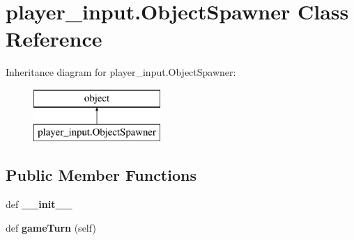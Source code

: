 \hypertarget{classplayer__input_1_1_object_spawner}{}\section{player\+\_\+input.\+Object\+Spawner Class Reference}
\label{classplayer__input_1_1_object_spawner}
Inheritance diagram for player\+\_\+input.\+Object\+Spawner\+:\begin{figure}[H]
\begin{center}
\leavevmode
\includegraphics[height=2.000000cm]{classplayer__input_1_1_object_spawner}
\end{center}
\end{figure}
\subsection*{Public Member Functions}
\begin{DoxyCompactItemize}
\item 
\hypertarget{classplayer__input_1_1_object_spawner_aad7fa3fa93308df207f6403a71701720}{}def {\bfseries \+\_\+\+\_\+init\+\_\+\+\_\+}\label{classplayer__input_1_1_object_spawner_aad7fa3fa93308df207f6403a71701720}

\item 
\hypertarget{classplayer__input_1_1_object_spawner_aa2bed9540e8f80eb247db0b89979b107}{}def {\bfseries game\+Turn} (self)\label{classplayer__input_1_1_object_spawner_aa2bed9540e8f80eb247db0b89979b107}

\end{DoxyCompactItemize}
